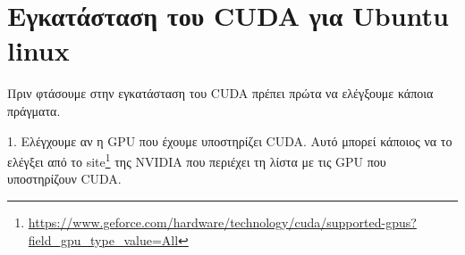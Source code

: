 

\section{Εγκατάσταση του {\lt CUDA} για {\lt Ubuntu linux}}

Πριν φτάσουμε στην εγκατάσταση του CUDA πρέπει πρώτα να ελέγξουμε κάποια πράγματα. 

1. Ελέγχουμε αν η GPU που έχουμε υποστηρίζει CUDA. Αυτό μπορεί κάποιος να το ελέγξει από το site\lt \footnote{\label{note1}  \url{ https://www.geforce.com/hardware/technology/cuda/supported-gpus?field_gpu_type_value=All}} της NVIDIA που περιέχει τη λίστα με τις GPU που υποστηρίζουν CUDA. 
